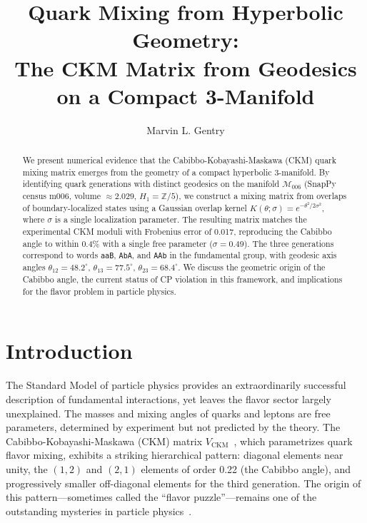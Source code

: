 \documentclass[epjc3]{svjour3}
\newcommand{\CKM}{V_{\mathrm{CKM}}}
\newcommand{\Msix}{\mathcal{M}_{006}}
\begin{document}
\title{Quark Mixing from Hyperbolic Geometry:\\
The CKM Matrix from Geodesics on a Compact 3-Manifold}

\author{Marvin L. Gentry}


\begin{abstract}
We present numerical evidence that the Cabibbo-Kobayashi-Maskawa (CKM)
quark mixing matrix emerges from the geometry of a compact hyperbolic
3-manifold. By identifying quark generations with distinct geodesics
on the manifold $\Msix$ (SnapPy census m006, volume $\approx 2.029$,
$H_1 = \mathbb{Z}/5$), we construct a mixing matrix from overlaps of
boundary-localized states using a Gaussian overlap kernel
$K(\theta;\sigma) = e^{-\theta^2/2\sigma^2}$, where $\sigma$
is a single localization parameter. The resulting matrix matches the experimental
CKM moduli with Frobenius error of 0.017, reproducing the Cabibbo angle
to within 0.4\% with a single free parameter ($\sigma = 0.49$). The three
generations correspond to words \texttt{aaB}, \texttt{AbA}, and
\texttt{AAb} in the fundamental group, with geodesic axis angles
$\theta_{12} = 48.2^\circ$, $\theta_{13} = 77.5^\circ$,
$\theta_{23} = 68.4^\circ$. We discuss the geometric origin of the
Cabibbo angle, the current status of CP violation in this framework,
and implications for the flavor problem in particle physics.
\end{abstract}

\maketitle

\section{Introduction}
\label{sec:intro}

The Standard Model of particle physics provides an extraordinarily 
successful description of fundamental interactions, yet leaves the 
flavor sector largely unexplained. The masses and mixing angles of 
quarks and leptons are free parameters, determined by experiment but 
not predicted by the theory. The Cabibbo-Kobayashi-Maskawa (CKM) matrix 
$\CKM$~\cite{Cabibbo1963,KobayashiMaskawa1973}, which parametrizes 
quark flavor mixing, exhibits a striking hierarchical pattern: diagonal 
elements near unity, the $(1,2)$ and $(2,1)$ elements of order 0.22 
(the Cabibbo angle), and progressively smaller off-diagonal elements 
for the third generation. The origin of this pattern---sometimes called 
the ``flavor puzzle''---remains one of the outstanding mysteries in 
particle physics~\cite{Feruglio2015}.
\end{document}
